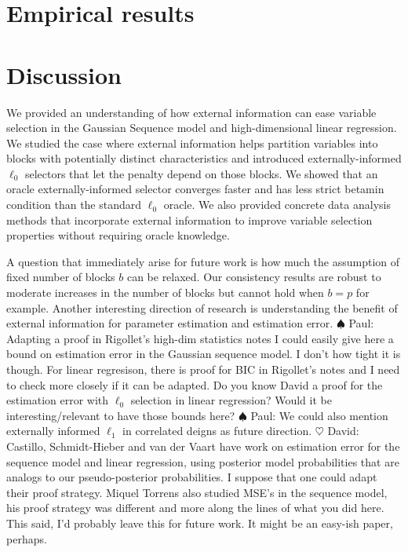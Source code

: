 \documentclass[aos]{imsart}
\theoremstyle{plain}
\newcommand{\david}[1]{{\small{\color{blue} \sf $\heartsuit$ David: #1}}}
\newcommand{\paul}[1]{{\small{\color{green} \sf $\spadesuit$ Paul: #1}}}
\begin{document}
\section{Empirical results}\label{sec:simulation}

\section{Discussion}\label{sec:discussion}

We provided an understanding of how external information can ease variable selection in the Gaussian Sequence model and high-dimensional linear regression. We studied the case where external information helps partition variables into blocks with potentially distinct characteristics and introduced externally-informed $\ell_0$ selectors that let the penalty depend on those blocks. We showed that an oracle externally-informed selector converges faster and has less strict betamin condition than the standard $\ell_0$ oracle. We also provided concrete data analysis methods that incorporate external information to improve variable selection properties without requiring oracle knowledge.

A question that immediately arise for future work is how much the assumption of fixed number of blocks $b$ can be relaxed. Our consistency results are robust to moderate increases in the number of blocks but cannot hold when $b=p$ for example. Another interesting direction of research is understanding the benefit of external information for parameter estimation and estimation error. \paul{Adapting a proof in Rigollet's high-dim statistics notes I could easily give here a bound on estimation error in the Gaussian sequence model. I don't how tight it is though. For linear regresison, there is proof for BIC in Rigollet's notes and I need to check more closely if it can be adapted. Do you know David a proof for the estimation error with $\ell_0$ selection in linear regression? Would it be interesting/relevant to have those bounds here?} \paul{We could also mention externally informed $\ell_1$ in correlated deigns as future direction.}
\david{Castillo, Schmidt-Hieber and van der Vaart have work on estimation error for the sequence model and linear regression, using posterior model probabilities that are analogs to our pseudo-posterior probabilities. I suppose that one could adapt their proof strategy. Miquel Torrens also studied MSE's in the sequence model, his proof strategy was different and more along the lines of what you did here. This said, I'd probably leave this for future work. It might be an easy-ish paper, perhaps.}
\end{document}
